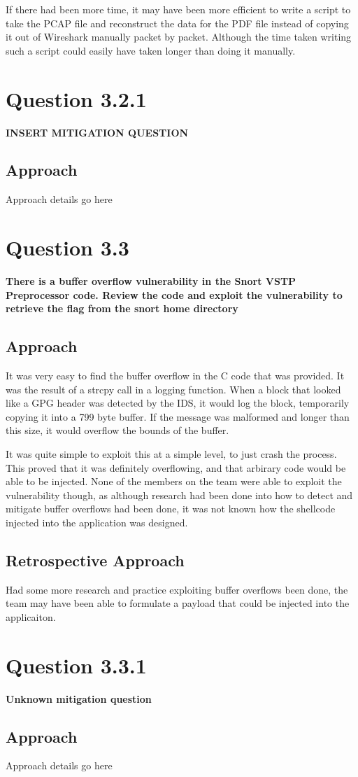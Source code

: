 If there had been more time, it may have been more efficient to write a
script to take the PCAP file and reconstruct the data for the PDF file
instead of copying it out of Wireshark manually packet by packet. Although
the time taken writing such a script could easily have taken longer than
doing it manually.

\section{Question 3.2.1}
\textbf{INSERT MITIGATION QUESTION}
\subsection{Approach}
Approach details go here

\section{Question 3.3}
\textbf{There is a buffer overflow vulnerability in the Snort VSTP Preprocessor
code. Review the code and exploit the vulnerability to retrieve the flag from
the snort home directory}
\subsection{Approach}
It was very easy to find the buffer overflow in the C code that was provided.
It was the result of a strcpy call in a logging function. When a block that
looked like a GPG header was detected by the IDS, it would log the block,
temporarily copying it into a 799 byte buffer. If the message was malformed
and longer than this size, it would overflow the bounds of the buffer.

It was quite simple to exploit this at a simple level, to just crash the
process. This proved that it was definitely overflowing, and that arbirary
code would be able to be injected. None of the members on the team were
able to exploit the vulnerability though, as although research had been done
into how to detect and mitigate buffer overflows had been done, it was not
known how the shellcode injected into the application was designed.

\subsection{Retrospective Approach}
Had some more research and practice exploiting buffer overflows been done, the
team may have been able to formulate a payload that could be injected into
the applicaiton.

\section{Question 3.3.1}
\textbf{Unknown mitigation question}
\subsection{Approach}
Approach details go here
